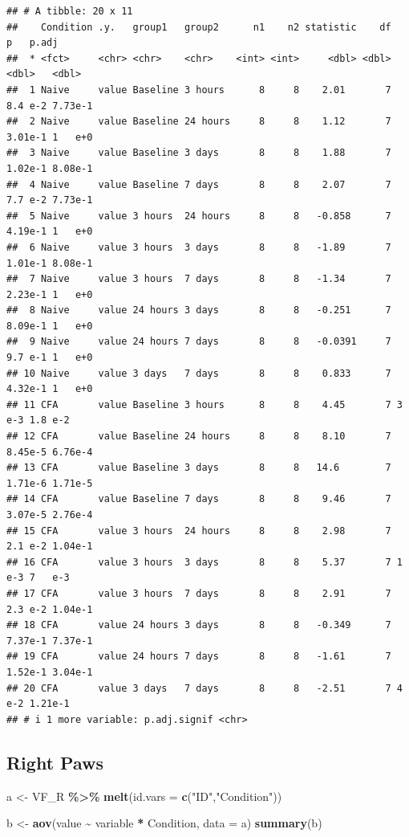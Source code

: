 \documentclass[
]{book}
\newenvironment{Shaded}{\begin{snugshade}}{\end{snugshade}}
\newcommand{\AttributeTok}[1]{\textcolor[rgb]{0.13,0.29,0.53}{#1}}
\newcommand{\FunctionTok}[1]{\textcolor[rgb]{0.13,0.29,0.53}{\textbf{#1}}}
\newcommand{\NormalTok}[1]{#1}
\newcommand{\OtherTok}[1]{\textcolor[rgb]{0.56,0.35,0.01}{#1}}
\newcommand{\SpecialCharTok}[1]{\textcolor[rgb]{0.81,0.36,0.00}{\textbf{#1}}}
\newcommand{\StringTok}[1]{\textcolor[rgb]{0.31,0.60,0.02}{#1}}
\begin{document}
\begin{verbatim}
## # A tibble: 20 x 11
##    Condition .y.   group1   group2      n1    n2 statistic    df       p   p.adj
##  * <fct>     <chr> <chr>    <chr>    <int> <int>     <dbl> <dbl>   <dbl>   <dbl>
##  1 Naive     value Baseline 3 hours      8     8    2.01       7 8.4 e-2 7.73e-1
##  2 Naive     value Baseline 24 hours     8     8    1.12       7 3.01e-1 1   e+0
##  3 Naive     value Baseline 3 days       8     8    1.88       7 1.02e-1 8.08e-1
##  4 Naive     value Baseline 7 days       8     8    2.07       7 7.7 e-2 7.73e-1
##  5 Naive     value 3 hours  24 hours     8     8   -0.858      7 4.19e-1 1   e+0
##  6 Naive     value 3 hours  3 days       8     8   -1.89       7 1.01e-1 8.08e-1
##  7 Naive     value 3 hours  7 days       8     8   -1.34       7 2.23e-1 1   e+0
##  8 Naive     value 24 hours 3 days       8     8   -0.251      7 8.09e-1 1   e+0
##  9 Naive     value 24 hours 7 days       8     8   -0.0391     7 9.7 e-1 1   e+0
## 10 Naive     value 3 days   7 days       8     8    0.833      7 4.32e-1 1   e+0
## 11 CFA       value Baseline 3 hours      8     8    4.45       7 3   e-3 1.8 e-2
## 12 CFA       value Baseline 24 hours     8     8    8.10       7 8.45e-5 6.76e-4
## 13 CFA       value Baseline 3 days       8     8   14.6        7 1.71e-6 1.71e-5
## 14 CFA       value Baseline 7 days       8     8    9.46       7 3.07e-5 2.76e-4
## 15 CFA       value 3 hours  24 hours     8     8    2.98       7 2.1 e-2 1.04e-1
## 16 CFA       value 3 hours  3 days       8     8    5.37       7 1   e-3 7   e-3
## 17 CFA       value 3 hours  7 days       8     8    2.91       7 2.3 e-2 1.04e-1
## 18 CFA       value 24 hours 3 days       8     8   -0.349      7 7.37e-1 7.37e-1
## 19 CFA       value 24 hours 7 days       8     8   -1.61       7 1.52e-1 3.04e-1
## 20 CFA       value 3 days   7 days       8     8   -2.51       7 4   e-2 1.21e-1
## # i 1 more variable: p.adj.signif <chr>
\end{verbatim}

\subsection*{Right Paws}\label{right-paws}

\begin{Shaded}
\begin{Highlighting}[]
\NormalTok{a }\OtherTok{\textless{}{-}}\NormalTok{ VF\_R }\SpecialCharTok{\%\textgreater{}\%}
  \FunctionTok{melt}\NormalTok{(}\AttributeTok{id.vars =} \FunctionTok{c}\NormalTok{(}\StringTok{"ID"}\NormalTok{,}\StringTok{"Condition"}\NormalTok{)) }

\NormalTok{b }\OtherTok{\textless{}{-}} \FunctionTok{aov}\NormalTok{(value }\SpecialCharTok{\textasciitilde{}}\NormalTok{ variable }\SpecialCharTok{*}\NormalTok{ Condition, }\AttributeTok{data =}\NormalTok{ a)}
\FunctionTok{summary}\NormalTok{(b)}
\end{Highlighting}
\end{Shaded}
\end{document}
